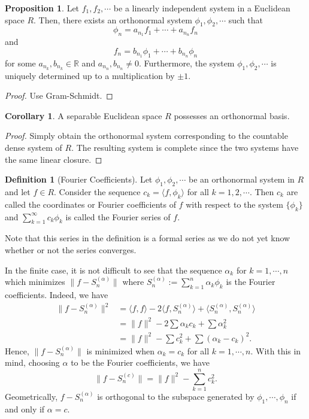 \documentclass[]{article}
\theoremstyle{definition}
\newtheorem{corollary}{Corollary}[theorem]
\theoremstyle{definition}
\newtheorem{definition}{Definition}[section]
\newtheorem{proposition}{Proposition}[section]
\begin{document}
\begin{proposition}
  Let \(f_1, f_2, \cdots\) be a linearly independent system in a Euclidean space 
  \(R\). Then, there exists an orthonormal system \(\phi_1, \phi_2, \cdots\) such 
  that 
  \[\phi_n = a_{n_1} f_1 + \cdots + a_{n_n} f_n\]
  and 
  \[f_n = b_{n_1}\phi_1 + \cdots + b_{n_n} \phi_n\]
  for some \(a_{n_k}, b_{n_k} \in \mathbb{R}\) and \(a_{n_n}, b_{n_n} \neq 0\).
  Furthermore, the system \(\phi_1, \phi_2, \cdots\) is uniquely determined up 
  to a multiplication by \(\pm 1\).
\end{proposition}
\begin{proof}
  Use Gram-Schmidt. 
\end{proof}

\begin{corollary}
  A separable Euclidean space \(R\) possesses an orthonormal basis.
\end{corollary}
\begin{proof}
  Simply obtain the orthonormal system corresponding to the countable dense 
  system of \(R\). The resulting system is complete since the two systems have the 
  same linear closure.
\end{proof}

\begin{definition}[Fourier Coefficients]
  Let \(\phi_1, \phi_2, \cdots\) be an orthonormal system in \(R\) and let \(f \in R\). 
  Consider the sequence \(c_k = \langle f, \phi_k \rangle\) for all \(k = 1, 2, \cdots\). 
  Then \(c_k\) are called the coordinates or Fourier coefficients of \(f\) with respect 
  to the system \(\{\phi_k\}\) and \(\sum_{k = 1}^\infty c_k \phi_k\) is 
  called the Fourier series of \(f\).
  
  Note that this series in the definition is a formal series as we do not yet 
  know whether or not the series converges.
\end{definition}

In the finite case, it is not difficult to see that the sequence 
\(\alpha_k\) for \(k = 1, \cdots, n\) which minimizes \(\|f - S_n^{(\alpha)}\|\) 
where \(S_n^{(\alpha)} := \sum_{k = 1}^n \alpha_k \phi_k\) is the Fourier coefficients. 
Indeed, we have 
\[\begin{split}
  \|f - S_n^{(\alpha)}\|^2 & = \langle f, f \rangle - 2 \langle f, S_n^{(\alpha)} \rangle +
    \langle S_n^{(\alpha)}, S_n^{(\alpha)} \rangle\\
    & = \|f\|^2 - 2 \sum \alpha_k c_k + \sum \alpha_k^2\\
    & = \|f\|^2 - \sum c_k^2 + \sum (\alpha_k - c_k)^2.
\end{split}\]
Hence, \(\|f - S_n^{(\alpha)}\|\) is minimized when \(\alpha_k = c_k\) for all 
\(k = 1, \cdots, n\). With this in mind, choosing \(\alpha\) to be the Fourier 
coefficients, we have 
\[\|f - S_n^{(c)}\| = \|f\|^2 - \sum_{k = 1}^n c_k^2.\]
Geometrically, \(f - S_n^{(\alpha)}\) is orthogonal to the subspace generated by 
\(\phi_1, \cdots, \phi_n\) if and only if \(\alpha = c\).
\end{document}
